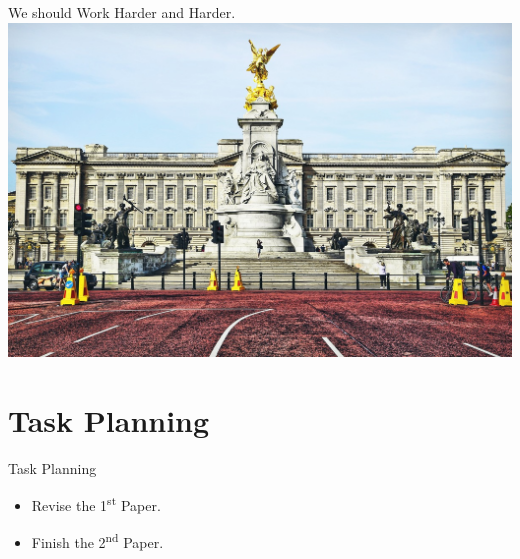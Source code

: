 \documentclass[10pt]{beamer}
\begin{document}
\begin{frame}{We should Work Harder and Harder.}
    \centering
    \includegraphics[width=\textwidth, height = 0.9\textheight]{Figures/Buckingham.jpg}
\end{frame}

\section{Task Planning}
\begin{frame}{Task Planning}
    \begin{itemize}
      \item Revise the 1\textsuperscript{st} Paper.
      \item Finish the 2\textsuperscript{nd} Paper.
    \end{itemize}
\end{frame}
\end{document}

